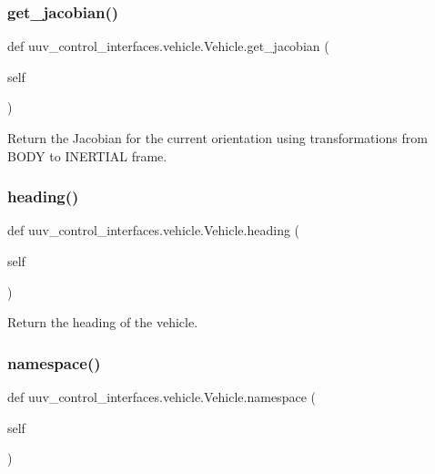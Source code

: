 \subsubsection{\texorpdfstring{get\+\_\+jacobian()}{get\_jacobian()}}
{\footnotesize\ttfamily def uuv\+\_\+control\+\_\+interfaces.\+vehicle.\+Vehicle.\+get\+\_\+jacobian (\begin{DoxyParamCaption}\item[{}]{self }\end{DoxyParamCaption})}

\begin{DoxyVerb}Return the Jacobian for the current orientation using transformations
from BODY to INERTIAL frame.
\end{DoxyVerb}
 \mbox{\label{classuuv__control__interfaces_1_1vehicle_1_1Vehicle_a8f75890ac723406a3f3b88a9cf3bac02}} 
\subsubsection{\texorpdfstring{heading()}{heading()}}
{\footnotesize\ttfamily def uuv\+\_\+control\+\_\+interfaces.\+vehicle.\+Vehicle.\+heading (\begin{DoxyParamCaption}\item[{}]{self }\end{DoxyParamCaption})}

\begin{DoxyVerb}Return the heading of the vehicle.\end{DoxyVerb}
 \mbox{\label{classuuv__control__interfaces_1_1vehicle_1_1Vehicle_a1577a1b5126b7bd9700529a29e15bb68}} 
\subsubsection{\texorpdfstring{namespace()}{namespace()}}
{\footnotesize\ttfamily def uuv\+\_\+control\+\_\+interfaces.\+vehicle.\+Vehicle.\+namespace (\begin{DoxyParamCaption}\item[{}]{self }\end{DoxyParamCaption})}

